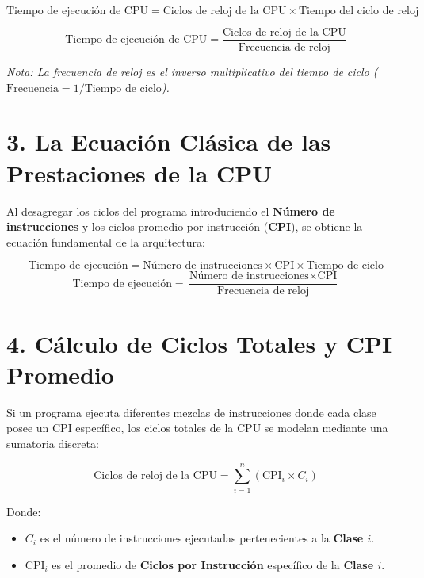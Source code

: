\documentclass[11pt, letterpaper]{article}
\begin{document}
\begin{tcolorbox}[title=Tiempo de CPU en función del Ciclo de Reloj]
$$\text{Tiempo de ejecución de CPU} = \text{Ciclos de reloj de la CPU} \times \text{Tiempo del ciclo de reloj}$$
\end{tcolorbox}

\begin{tcolorbox}[title=Tiempo de CPU en función de la Frecuencia]
$$\text{Tiempo de ejecución de CPU} = \frac{\text{Ciclos de reloj de la CPU}}{\text{Frecuencia de reloj}}$$
\end{tcolorbox}
\textit{Nota: La frecuencia de reloj es el inverso multiplicativo del tiempo de ciclo ($\text{Frecuencia} = 1 / \text{Tiempo de ciclo}$).}

\section{3. La Ecuación Clásica de las Prestaciones de la CPU}

Al desagregar los ciclos del programa introduciendo el \textbf{Número de instrucciones} y los ciclos promedio por instrucción (\textbf{CPI}), se obtiene la ecuación fundamental de la arquitectura:

\begin{tcolorbox}[title=Ecuación Clásica de Rendimiento de la CPU]
$$\text{Tiempo de ejecución} = \text{Número de instrucciones} \times \text{CPI} \times \text{Tiempo de ciclo}$$
$$\text{Tiempo de ejecución} = \frac{\text{Número de instrucciones} \times \text{CPI}}{\text{Frecuencia de reloj}}$$
\end{tcolorbox}

\section{4. Cálculo de Ciclos Totales y CPI Promedio}

Si un programa ejecuta diferentes mezclas de instrucciones donde cada clase posee un CPI específico, los ciclos totales de la CPU se modelan mediante una sumatoria discreta:

\begin{tcolorbox}[title=Ciclos de Reloj Totales (Múltiples Clases)]
$$\text{Ciclos de reloj de la CPU} = \sum_{i=1}^{n} (\text{CPI}_i \times C_i)$$
\end{tcolorbox}
Donde:
\begin{itemize}
    \item $C_i$ es el número de instrucciones ejecutadas pertenecientes a la \textbf{Clase $i$}.
    \item $\text{CPI}_i$ es el promedio de \textbf{Ciclos por Instrucción} específico de la \textbf{Clase $i$}.
\end{itemize}
\end{document}
